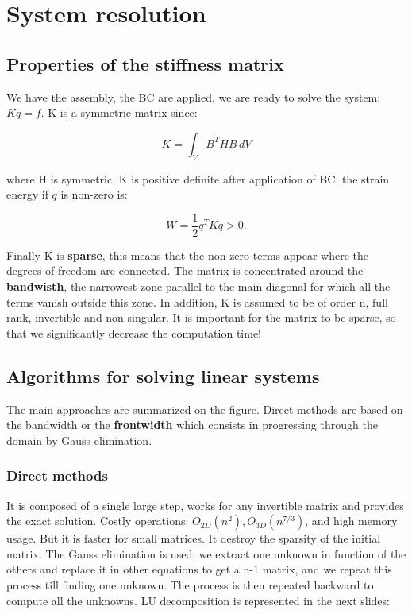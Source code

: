 
\chapter{System resolution}
\section{Properties of the stiffness matrix}
	We have the assembly, the BC are applied, we are ready to solve the system: $Kq = f$. K is a symmetric matrix since:
	
	\begin{equation}
	K = \int _{V} B^T HB \, dV
	\end{equation}
	
	where H is symmetric. K is positive definite after application of BC, the strain energy if $q$ is non-zero is:
	
	\begin{equation}
	W = \frac{1}{2} q^T K q >  0. 
	\end{equation}
	
	Finally K is \textbf{sparse}, this means that the non-zero terms appear where the degrees of freedom are connected. The matrix is concentrated around the \textbf{bandwisth}, the narrowest zone parallel to the main diagonal for which all the terms vanish outside this zone. In addition, K is assumed to be of order n, full rank, invertible and non-singular. It is important for the matrix to be sparse, so that we significantly decrease the computation time! 
	
\section{Algorithms for solving linear systems}
	The main approaches are summarized on the figure. Direct methods are based on the bandwidth or the \textbf{frontwidth} which consists in progressing through the domain by Gauss elimination. 
	
\subsection{Direct methods}
	It is composed of a single large step, works for any invertible matrix and provides the exact solution. Costly operations: $O_{2D}(n^2), O_{3D}(n^{7/3})$, and high memory usage. But it is faster for small matrices. It destroy the sparsity of the initial matrix. The Gauss elimination is used, we extract one unknown in function of the others and replace it in other equations to get a n-1 matrix, and we repeat this process till finding one unknown. The process is then repeated backward to compute all the unknowns. LU decomposition is represented in the next slides: 
	
